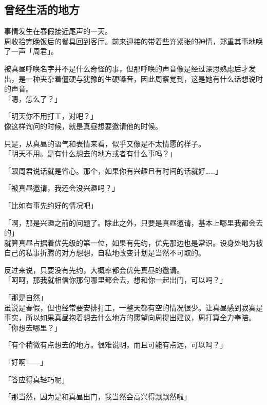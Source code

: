 \subsection{曾经生活的地方}

事情发生在春假接近尾声的一天。\\

周收拾完晚饭后的餐具回到客厅。前来迎接的带着些许紧张的神情，郑重其事地唤了一声「周君」。

被真昼呼唤名字并不是什么奇怪的事，但那呼唤的声音像是经过深思熟虑后才发出，是一种夹杂着僵硬与犹豫的生硬嗓音，因此周察觉到，这是她有什么话想说时的声音。\\

「嗯，怎么了？」

「明天你不用打工，对吧？」\\

像这样询问的时候，就是真昼想要邀请他的时候。

只是，从真昼的语气和表情来看，似乎又像是不太情愿的样子。\\

「明天不用。是有什么想去的地方或者有什么事吗？」

「跟周君说话就是省心。那个，如果你有兴趣且有时间的话就好……」

「被真昼邀请，我还会没兴趣吗？」

「比如有事先约好的情况吧」

「啊，那是兴趣之前的问题了。除此之外，只要是真昼邀请，基本上哪里我都会去的」\\

就算真昼占据着优先级的第一位，如果有先约，优先那边也是常识。设身处地为被自己的私事折腾的对方想想，自私地改变计划是当然不可取的。

反过来说，只要没有先约，大概率都会优先真昼的邀请。\\

「呵呵，那我就相信你那句哪里都会去，想和你一起出门，可以吗？」

「那是自然」\\

虽说是春假，但也经常要安排打工，一整天都有空的情况很少。让真昼感到寂寞是事实，所以如果真昼抱着想去什么地方的愿望向周提出建议，周打算全力奉陪。\\

「你想去哪里？」

「有个稍微有点想去的地方。很难说明，而且可能有点远，可以吗？」

「好啊——」

「答应得真轻巧呢」

「那当然，因为是和真昼出门，我当然会高兴得飘飘然啦」

